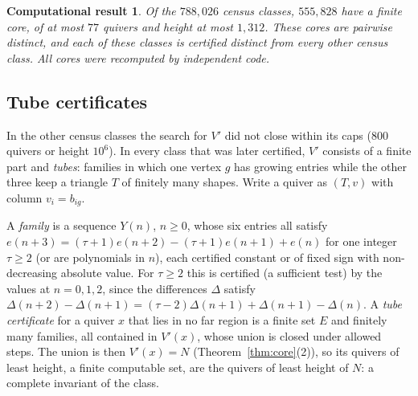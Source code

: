\documentclass[11pt]{amsart}
\newtheorem{computation}[theorem]{Computational result}
\theoremstyle{definition}
\theoremstyle{remark}
\newcommand{\Vp}{V'}
\begin{document}
\begin{computation}\label{comp:cores}
Of the $788{,}026$ census classes, $555{,}828$ have a finite core, of at most $77$ quivers and height at most $1{,}312$. These cores are pairwise distinct, and each of these classes is certified distinct from every other census class. All cores were recomputed by independent code.
\end{computation}

\subsection{Tube certificates}
In the other census classes the search for $\Vp$ did not close within its caps ($800$ quivers or height $10^6$). In every class that was later certified, $\Vp$ consists of a finite part and \emph{tubes}: families in which one vertex $g$ has growing entries while the other three keep a triangle $T$ of finitely many shapes. Write a quiver as $(T,v)$ with column $v_i=b_{ig}$.

A \emph{family} is a sequence $Y(n)$, $n\ge0$, whose six entries all satisfy $e(n+3)=(\tau+1)e(n+2)-(\tau+1)e(n+1)+e(n)$ for one integer $\tau\ge2$ (or are polynomials in $n$), each certified constant or of fixed sign with non-decreasing absolute value. For $\tau\ge2$ this is certified (a sufficient test) by the values at $n=0,1,2$, since the differences $\Delta$ satisfy $\Delta(n+2)-\Delta(n+1)=(\tau-2)\Delta(n+1)+\Delta(n+1)-\Delta(n)$. A \emph{tube certificate} for a quiver $x$ that lies in no far region is a finite set $E$ and finitely many families, all contained in $\Vp(x)$, whose union is closed under allowed steps. The union is then $\Vp(x)=N$ (Theorem~\ref{thm:core}(2)), so its quivers of least height, a finite computable set, are the quivers of least height of $N$: a complete invariant of the class.
\end{document}
